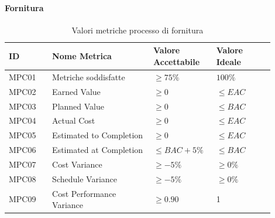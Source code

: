 \documentclass[a4paper,12pt]{article}
\begin{document}
                \paragraph{Fornitura} \mbox{}
                    \begin{longtable}{|M{0.15\linewidth}|M{0.35\linewidth}|M{0.2\linewidth}|M{0.2\linewidth}|}

                        \caption{Valori metriche processo di fornitura} \\
                        \hline
                        \textbf{ID} & \textbf{Nome Metrica} & \textbf{Valore Accettabile} & \textbf{Valore Ideale} \\
                        \hline
                        \endhead

                        MPC01 & Metriche soddisfatte & $\ge 75\%$ & $100\%$ \\
                        \hline

                        MPC02 & Earned Value & $\ge 0$ & $\le EAC$ \\
                        \hline
                        
                        MPC03 & Planned Value & $\ge 0$ & $\le BAC$ \\
                        \hline
                        
                        MPC04 & Actual Cost & $\ge 0$ & $\le EAC$\\
                        \hline
                        
                        MPC05 & Estimated to Completion & $\ge 0$ & $\le EAC$ \\
                        \hline

                        MPC06 & Estimated at Completion & $\le BAC + 5\%$ & $\le BAC$ \\
                        \hline

                        MPC07 & Cost Variance & $\ge -5\%$ & $\ge 0\%$\\
                        \hline

                        MPC08 & Schedule Variance & $\ge -5\%$ & $\ge 0\%$\\
                        \hline

                        MPC09 & Cost Performance Variance & $\ge 0.90$ & 1 \\
                        \hline

                    \end{longtable}
\end{document}
